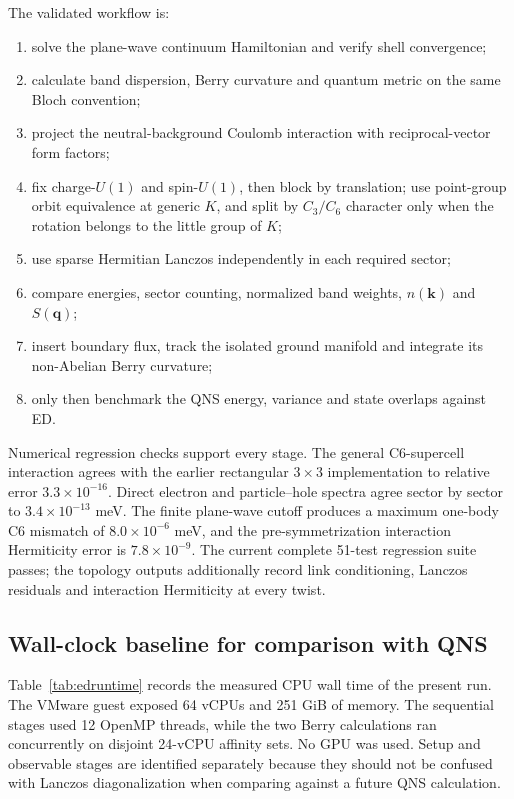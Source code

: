 \documentclass[10pt,twocolumn]{article}
\begin{document}
The validated workflow is:
\begin{enumerate}
\item solve the plane-wave continuum Hamiltonian and verify shell convergence;
\item calculate band dispersion, Berry curvature and quantum metric on the same Bloch convention;
\item project the neutral-background Coulomb interaction with reciprocal-vector form factors;
\item fix charge-$U(1)$ and spin-$U(1)$, then block by translation; use point-group orbit equivalence at generic $K$, and split by $C_3/C_6$ character only when the rotation belongs to the little group of $K$;
\item use sparse Hermitian Lanczos independently in each required sector;
\item compare energies, sector counting, normalized band weights, $n(\bm k)$ and $S(\bm q)$;
\item insert boundary flux, track the isolated ground manifold and integrate its non-Abelian Berry curvature;
\item only then benchmark the QNS energy, variance and state overlaps against ED.
\end{enumerate}

Numerical regression checks support every stage.  The general C6-supercell interaction agrees with the earlier rectangular $3\times3$ implementation to relative error $3.3\times10^{-16}$.  Direct electron and particle--hole spectra agree sector by sector to $3.4\times10^{-13}$ meV.  The finite plane-wave cutoff produces a maximum one-body C6 mismatch of $8.0\times10^{-6}$ meV, and the pre-symmetrization interaction Hermiticity error is $7.8\times10^{-9}$.  The current complete 51-test regression suite passes; the topology outputs additionally record link conditioning, Lanczos residuals and interaction Hermiticity at every twist.

\subsection{Wall-clock baseline for comparison with QNS}

Table~\ref{tab:edruntime} records the measured CPU wall time of the present
run.  The VMware guest exposed 64 vCPUs and 251 GiB of memory.  The sequential
stages used 12 OpenMP threads, while the two Berry calculations ran concurrently
on disjoint 24-vCPU affinity sets.  No GPU was used.  Setup and observable stages
are identified separately because they should not be confused with Lanczos
diagonalization when comparing against a future QNS calculation.
\end{document}
